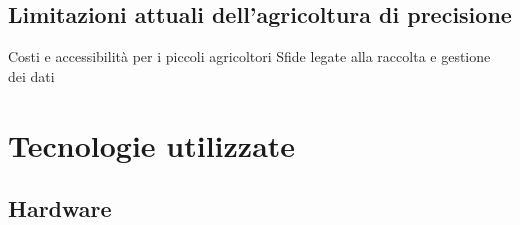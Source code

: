 \documentclass[12pt,a4paper,openright,twoside]{book}
\begin{document}
\section{Limitazioni attuali dell’agricoltura di precisione}
\label{limiti}
Costi e accessibilità per i piccoli agricoltori
Sfide legate alla raccolta e gestione dei dati


\chapter{Tecnologie utilizzate}




\section{Hardware}
\end{document}
